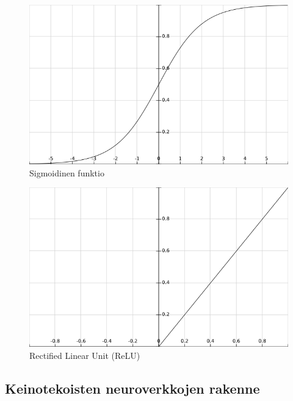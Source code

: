 \documentclass[finnish]{tktltiki2}
\theoremstyle{definition}
\theoremstyle{remark}
\begin{document}
    \begin{figure}[h]
      \centering
      \includegraphics[scale=0.3]{sigmoid}
      \caption{Sigmoidinen funktio}
      \label{pic:sigmoid}
    \end{figure}

    \begin{figure}[h]
      \centering
      \includegraphics[scale=0.3]{relu}
      \caption{Rectified Linear Unit (ReLU)}
      \label{pic:relu}
    \end{figure}



  \subsection{Keinotekoisten neuroverkkojen rakenne}
\end{document}
